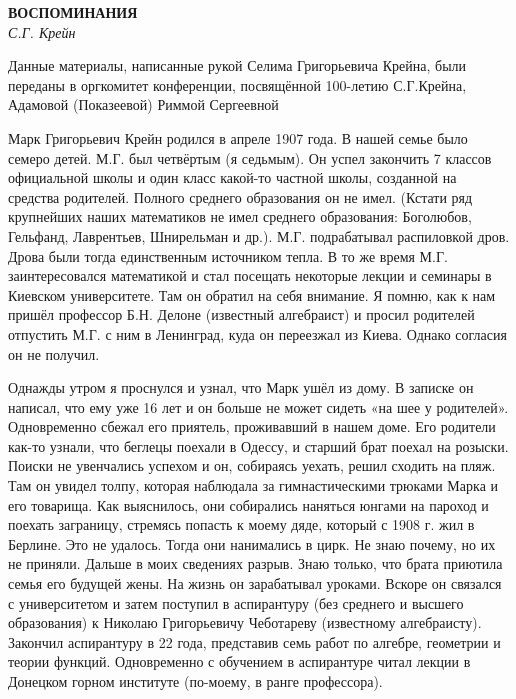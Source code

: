 \begin{center}{ \bf  ВОСПОМИНАНИЯ}\\
{\it С.Г. Крейн} \\
\end{center}
\begin{flushright}
Данные материалы,
написанные рукой Селима Григорьевича Крейна,
были переданы в оргкомитет конференции,
посвящённой 100-летию С.Г.Крейна,
 Адамовой (Показеевой) Риммой  Сергеевной
\end{flushright}

Марк Григорьевич Крейн родился в апреле 1907 года. В нашей семье было семеро детей. М.Г. был четвёртым (я седьмым). Он успел закончить 7 классов официальной школы и один класс какой-то частной школы, созданной на средства родителей. Полного среднего образования он не имел. (Кстати ряд крупнейших наших математиков не имел среднего образования: Боголюбов, Гельфанд, Лаврентьев, Шнирельман и др.). М.Г. подрабатывал распиловкой дров. Дрова были тогда единственным источником тепла. В то же время М.Г. заинтересовался математикой и стал посещать некоторые лекции и семинары в Киевском университете. Там он обратил на себя внимание. Я помню, как к нам пришёл профессор Б.Н. Делоне (известный алгебраист) и просил родителей отпустить М.Г. с ним в Ленинград, куда он переезжал из Киева. Однако согласия он не получил.

Однажды утром я проснулся и узнал, что Марк ушёл из дому. В записке он написал, что ему уже 16 лет и он больше не может сидеть «на шее у родителей». Одновременно сбежал его приятель, проживавший в нашем доме. Его родители как-то узнали, что беглецы поехали в Одессу, и старший брат поехал на розыски. Поиски не увенчались успехом и он, собираясь уехать, решил сходить на пляж. Там он увидел толпу, которая наблюдала за гимнастическими трюками Марка и его товарища. Как выяснилось, они собирались наняться юнгами на пароход и поехать заграницу, стремясь попасть к моему дяде, который с 1908 г. жил в Берлине. Это не удалось. Тогда они нанимались в цирк. Не знаю почему, но их не приняли. Дальше в моих сведениях разрыв. Знаю только, что брата приютила семья его будущей жены. На жизнь он зарабатывал уроками. Вскоре он связался с университетом и затем поступил в аспирантуру (без среднего и высшего образования) к Николаю Григорьевичу Чеботареву (известному алгебраисту). Закончил аспирантуру в 22 года, представив семь работ по алгебре, геометрии и теории функций. Одновременно с обучением в аспирантуре читал лекции в Донецком горном институте (по-моему, в ранге профессора).

